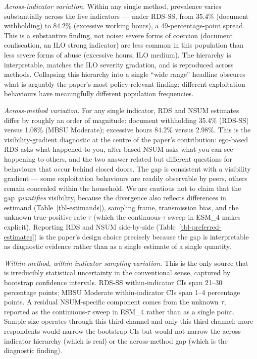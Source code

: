 \documentclass[
  12pt,
  letterpaper,
  DIV=11,
  numbers=noendperiod]{scrartcl}
\begin{document}
\emph{Across-indicator variation.} Within any single method, prevalence
varies substantially across the five indicators --- under RDS-SS, from
35.4\% (document withholding) to 84.2\% (excessive working hours), a
49-percentage-point spread. This is a substantive finding, not noise:
severe forms of coercion (document confiscation, an ILO strong
indicator) are less common in this population than less severe forms of
abuse (excessive hours, ILO medium). The hierarchy is interpretable,
matches the ILO severity gradation, and is reproduced across methods.
Collapsing this hierarchy into a single ``wide range'' headline obscures
what is arguably the paper's most policy-relevant finding: different
exploitation behaviours have meaningfully different population
frequencies.

\emph{Across-method variation.} For any single indicator, RDS and NSUM
estimates differ by roughly an order of magnitude: document withholding
35.4\% (RDS-SS) versus 1.08\% (MBSU Moderate); excessive hours 84.2\%
versus 2.98\%. This is the visibility-gradient diagnostic at the centre
of the paper's contribution: ego-based RDS asks what happened to you,
alter-based NSUM asks what you can see happening to others, and the two
answer related but different questions for behaviours that occur behind
closed doors. The gap is consistent with a visibility gradient --- some
exploitation behaviours are readily observable by peers, others remain
concealed within the household. We are cautious not to claim that the
gap \emph{quantifies} visibility, because the divergence also reflects
differences in estimand (Table~\ref{tbl-estimands}), sampling frame,
transmission bias, and the unknown true-positive rate \(\tau\) (which
the continuous-\(\tau\) sweep in ESM\_4 makes explicit). Reporting RDS
and NSUM side-by-side (Table~\ref{tbl-preferred-estimates}) is the
paper's design choice precisely because the gap is interpretable as
diagnostic evidence rather than as a single estimate of a single
quantity.

\emph{Within-method, within-indicator sampling variation.} This is the
only source that is irreducibly statistical uncertainty in the
conventional sense, captured by bootstrap confidence intervals. RDS-SS
within-indicator CIs span 21--30 percentage points; MBSU Moderate
within-indicator CIs span 1--4 percentage points. A residual
NSUM-specific component comes from the unknown \(\tau\), reported as the
continuous-\(\tau\) sweep in ESM\_4 rather than as a single point.
Sample size operates through this third channel and only this third
channel: more respondents would narrow the bootstrap CIs but would not
narrow the across-indicator hierarchy (which is real) or the
across-method gap (which is the diagnostic finding).
\end{document}
